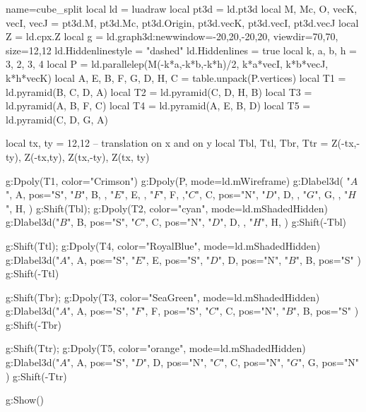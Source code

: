 \documentclass[12pt]{standalone}
\begin{document}
\begin{luadraw}{name=cube_split}
local ld = luadraw
local pt3d = ld.pt3d
local M, Mc, O, vecK, vecI, vecJ = pt3d.M, pt3d.Mc, pt3d.Origin, pt3d.vecK, pt3d.vecI, pt3d.vecJ
local Z = ld.cpx.Z
local g = ld.graph3d:new{window={-20,20,-20,20}, viewdir={70,70}, size={12,12}}
ld.Hiddenlinestyle = "dashed"
ld.Hiddenlines = true
local k, a, b, h = 3, 2, 3, 4
local P = ld.parallelep(M(-k*a,-k*b,-k*h)/2, k*a*vecI, k*b*vecJ, k*h*vecK)
local A, E, B, F, G, D, H, C = table.unpack(P.vertices)
local T1 = ld.pyramid({B, C, D}, A)
local T2 = ld.pyramid({C, D, H}, B)
local T3 = ld.pyramid({A, B, F}, C)
local T4 = ld.pyramid({A, E, B}, D)
local T5 = ld.pyramid({C, D, G}, A)

local tx, ty = 12,12 -- translation on x and on y
local Tbl, Ttl, Tbr, Ttr = Z(-tx,-ty), Z(-tx,ty), Z(tx,-ty), Z(tx, ty) 

g:Dpoly(T1, {color="Crimson"})
g:Dpoly(P, {mode=ld.mWireframe})
g:Dlabel3d(
    "$A$", A, {pos="S"}, "$B$", B, {}, 
    "$E$", E, {}, "$F$", F, {},"$C$", C, {pos="N"}, "$D$", D, {}, "$G$", G, {}, "$H$", H, {}
)
g:Shift(Tbl); g:Dpoly(T2, {color="cyan", mode=ld.mShadedHidden})
g:Dlabel3d("$B$", B, {pos="S"}, "$C$", C, {pos="N"}, "$D$", D, {}, "$H$", H, {} )
g:Shift(-Tbl)

g:Shift(Ttl); g:Dpoly(T4, {color="RoyalBlue", mode=ld.mShadedHidden})
g:Dlabel3d("$A$", A, {pos="S"}, "$E$", E, {pos="S"}, "$D$", D, {pos="N"}, "$B$", B, {pos="S"} )
g:Shift(-Ttl)

g:Shift(Tbr); g:Dpoly(T3, {color="SeaGreen", mode=ld.mShadedHidden})
g:Dlabel3d("$A$", A, {pos="S"}, "$F$", F, {pos="S"}, "$C$", C, {pos="N"}, "$B$", B, {pos="S"} )
g:Shift(-Tbr)

g:Shift(Ttr); g:Dpoly(T5, {color="orange", mode=ld.mShadedHidden})
g:Dlabel3d("$A$", A, {pos="S"}, "$D$", D, {pos="N"}, "$C$", C, {pos="N"}, "$G$", G, {pos="N"} )
g:Shift(-Ttr)

g:Show()
\end{luadraw}
\end{document}
